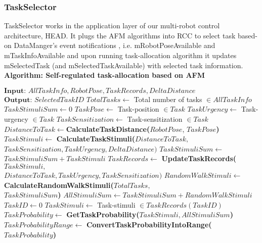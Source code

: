 \subsubsection*{TaskSelector}
TaskSelector works in the application layer of our multi-robot control architecture, HEAD. It plugs the AFM algorithms into RCC to select task based-on DataManger's event notifications , i.e. mRobotPoseAvailable and mTaskInfoAvailable and upon running task-allocation algorithm it updates  mSelectedTask (and mSelectedTaskAvailable) with selected task information.
\newline
\textbf{Algorithm: Self-regulated task-allocation based on AFM}
\begin{algorithmic}[1]
\begin{small}
\label{alg:task-selector}
\State $\textbf{Input: } AllTaskInfo, RobotPose, TaskRecords, DeltaDistance$
\State $\textbf{Output: } SelectedTaskID$
\State {}
\State $TotalTasks \gets$  Total number of tasks $\in AllTaskInfo$  
\State $ TaskStimuliSum \gets 0 $
\State $ TaskPose \gets  $ Task-position  $ \in Task$
\State $ TaskUrgency \gets $ Task-urgency $ \in Task$
\State $ TaskSensitization \gets $ Task-sensitization $\in Task$
\State $ DistanceToTask \gets  $\textbf{CalculateTaskDistance(}$RobotPose$, $TaskPose$\textbf{)}
\State $ TaskStimuli \gets  $ \textbf{CalculateTaskStimuli(}$DistanceToTask,$\\ \hspace*{3.5cm} $TaskSensitization, 	        TaskUrgency, DeltaDistance\textbf{)}$
\State $ TaskStimuliSum \gets$  $TaskStimuliSum + TaskStimuli$
\State $ TaskRecords \gets $ \textbf{UpdateTaskRecords(}$TaskStimuli,$\\ \hspace*{3.5cm}$DistanceToTask, TaskUrgency, TaskSensitization\textbf{)}$
\EndFor
\State $RandomWalkStimuli \gets $ \textbf{CalculateRandomWalkStimuli(}$TotalTasks,$\\ \hspace*{4.5cm} $TaskStimuliSum$\textbf{)}
\State $ AllStimuliSum \gets TaskStimuliSum + RandomWalkStimuli $
\State {}
\State $ TaskID \gets 0 $ 
\State $ TaskStimuli \gets $ Task-stimuli $\in TaskRecords(TaskID)$
\State $ TaskProbability \gets  $ \textbf{GetTaskProbability(}$TaskStimuli, AllStimuliSum$\textbf{)}
\State $ TaskProbabilityRange \gets $ \textbf{ConvertTaskProbabilityIntoRange(}\\ \hspace*{6cm}$TaskProbability$\textbf{)}

\end{small}
\end{algorithmic}
